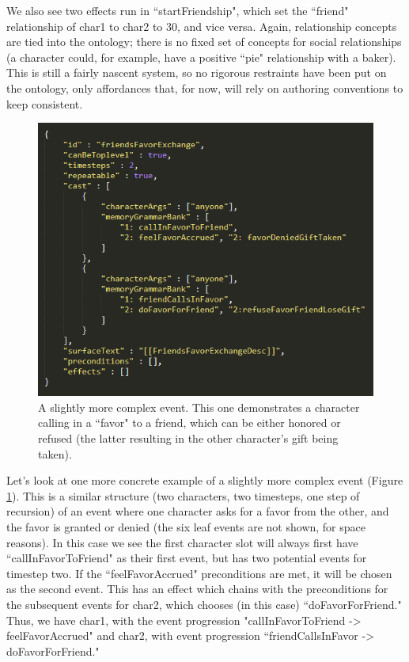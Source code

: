 We also see two effects run in ``startFriendship", which set the ``friend" relationship of char1 to char2 to 30, and vice versa. Again, relationship concepts are tied into the ontology; there is no fixed set of concepts for social relationships (a character could, for example, have a positive ``pie" relationship with a baker). This is still a fairly nascent system, so no rigorous restraints have been put on the ontology, only affordances that, for now, will rely on authoring conventions to keep consistent.


\begin{figure}
    \centering
    \includegraphics[width=\textwidth]{figures/4-Delve/delve-complex-event.png}
    \caption{A slightly more complex event. This one demonstrates a character calling in a ``favor" to a friend, which can be either honored or refused (the latter resulting in the other character's gift being taken).}
    \label{fig:complex-event-sequence}
\end{figure}


Let's look at one more concrete example of a slightly more complex event (Figure \ref{fig:complex-event-sequence}). This is a similar structure (two characters, two timesteps, one step of recursion) of an event where one character asks for a favor from the other, and the favor is granted or denied (the six leaf events are not shown, for space reasons). In this case we see the first character slot will always first have ``callInFavorToFriend" as their first event, but has two potential events for timestep two. If the ``feelFavorAccrued" preconditions are met, it will be chosen as the second event. This has an effect which chains with the preconditions for the subsequent events for char2, which chooses (in this case) ``doFavorForFriend." Thus, we have char1, with the event progression "callInFavorToFriend -> feelFavorAccrued" and char2, with event progression ``friendCallsInFavor -> doFavorForFriend."

